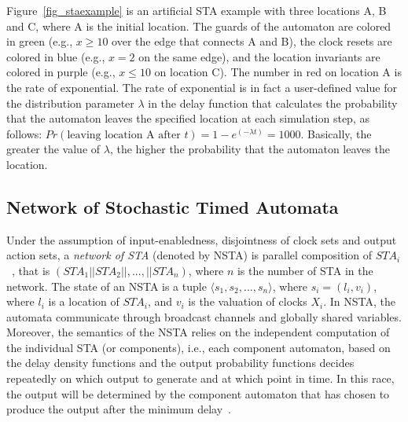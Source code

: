 \begin{example} Figure~\ref{fig_staexample} is an artificial STA example with three locations A, B and C, where A is the initial location. The guards of the automaton are colored in green (e.g., $x\geq10$ over the edge that connects A and B), the clock resets are colored in blue (e.g., $x=2$ on the same edge), and the location invariants are colored in purple (e.g., $x\leq 10$ on location C). The number in red on location A is the rate of exponential.
The rate of exponential is in fact a user-defined value for the distribution parameter $\lambda$ in the delay function that calculates the probability that the automaton leaves the specified location at each simulation step, as follows:
$Pr(\mbox{leaving location A after } t) = 1 - e^{(-\lambda t)}  = 1000$. Basically, the greater the value of $\lambda$, the higher the probability that the automaton leaves the location.
\end{example}


\subsection*{Network of Stochastic Timed Automata}
Under the assumption of input-enabledness, disjointness of clock sets and output action sets, a \textit{network of STA} (denoted by NSTA) is parallel composition of $STA_i$~\cite{David2011StochasticAutomata}, that is $(STA_1||STA_2||,...,||STA_n)$, where $n$ is the number of STA in the network. The state of an NSTA is a tuple $\langle s_1,s_2,...,s_n\rangle$, where $s_i = (l_i, v_i)$, where $l_i$ is a location of $STA_i$, and $v_i$ is the valuation of clocks $X_i$. In NSTA, the automata communicate through broadcast channels and globally shared variables. Moreover, the semantics of the NSTA relies on the independent computation of the individual STA (or components), i.e.,  each component automaton, based on the delay density functions and the output probability functions decides repeatedly on which output to generate and at which point in time. In this race, the output will be determined by the component automaton that has chosen to produce the output after the minimum delay~\cite{David2011StatisticalAutomata}.


